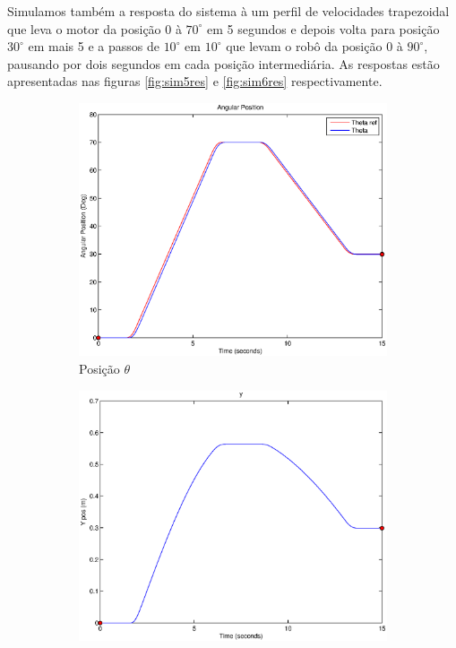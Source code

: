 \documentclass{article}
\begin{document}
Simulamos também a resposta do sistema à um perfil de velocidades trapezoidal que leva o motor da posição $0$ à $70^\circ$ em 5 segundos e depois volta para posição $30^\circ$ em mais 5 e a passos de $10^\circ$ em $10^\circ$ que levam o robô da posição $0$ à $90^\circ$, pausando por dois segundos em cada posição intermediária. As respostas estão apresentadas nas figuras \ref{fig:sim5res} e \ref{fig:sim6res} respectivamente.

\begin{figure}[H]
	\centering
	\begin{subfigure}{0.32\textwidth}
		\includegraphics[width=\linewidth]{matlab/theta5}
		\caption{Posição $\theta$}
	\end{subfigure}
	\begin{subfigure}{0.32\textwidth}
		\includegraphics[width=\linewidth]{matlab/y5}

\end{subfigure}
\end{figure}
\end{document}
